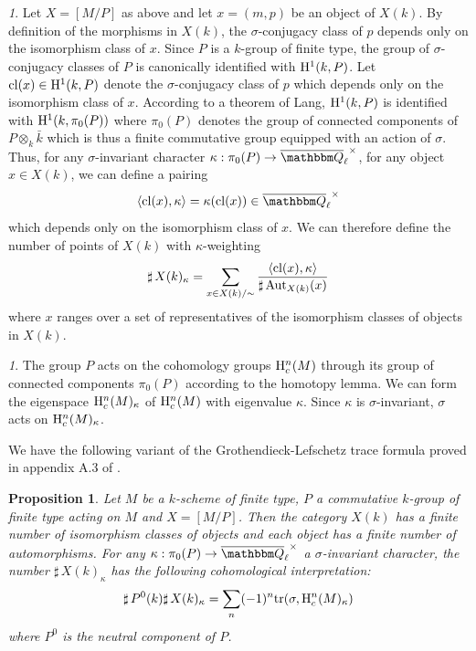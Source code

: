 \documentclass[12pt,english]{smfart}
\numberwithin{equation}{subsection}
\newtheorem{proposition}[equation]{Proposition}
\theoremstyle{remark}
\newtheorem{numero}[equation]{}
\newcommand\QQ{{\mathbbm Q}}
\newcommand\rmH{{\rm H}}
\newcommand\tr{{\rm tr}}
\newcommand\Aut{{\rm Aut}}
\newcommand\cl{{\rm cl}}
\newcommand\Ql{{\overline\QQ_\ell}}
\begin{document}
\begin{numero}
Let $X=[M/ P]$ as above and let $x=(m,p)$ be an object of $X(k)$. By
definition of the morphisms in $X(k)$, the $\sigma$-conjugacy class of
$p$ depends only on the isomorphism class of $x$. Since $P$ is a
$k$-group of finite type, the group of $\sigma$-conjugacy classes of
$P$ is canonically identified with $\rmH^1(k,P)$. Let $\cl(x)\in
\rmH^1(k,P)$ denote the $\sigma$-conjugacy class of $p$ which depends only
on the isomorphism class of $x$. According to a theorem of Lang,
$\rmH^1(k,P)$ is identified with $\rmH^1(k,\pi_0(P))$ where $\pi_0(P)$ denotes
the group of connected components of $P\otimes_k
\bar k$ which is thus a finite commutative group equipped with an action of
$\sigma$. Thus, for any $\sigma$-invariant character $\kappa:
\pi_0(P)\rightarrow \Ql^\times$, for any object $x\in X(k)$, we can
define a pairing
$$\langle \cl(x), \kappa \rangle =\kappa(\cl(x)) \in \Ql^\times$$
which depends only on the isomorphism class of $x$. We can therefore
define the number of points of $X(k)$ with $\kappa$-weighting
$${\sharp\,} X(k)_\kappa= \sum_{x\in X(k)/\sim}
\frac {\langle \cl(x), \kappa \rangle}{{\sharp\,} \Aut_{X(k)}(x)}$$
where $x$ ranges over a set of representatives of the
isomorphism classes of objects in $X(k)$.
\end{numero}

\begin{numero}
The group $P$ acts on the cohomology groups $\rmH^n_c(M)$
through its group of connected components $\pi_0(P)$ according to the
homotopy lemma. We can form the eigenspace
$\rmH^n_c(M)_\kappa$ of $\rmH^n_c(M)$ with eigenvalue $\kappa$.
Since $\kappa$ is $\sigma$-invariant, $\sigma$ acts on
$\rmH^n_c(M)_\kappa$.
\end{numero}

We have the following variant of the Grothendieck-Lefschetz trace formula
proved in appendix A.3 of \cite{LN}.

\begin{proposition}\label{formule des points fixes}
Let $M$ be a $k$-scheme of finite type, $P$ a commutative $k$-group of finite type
acting on $M$ and $X=[M/ P]$. Then the category $X(k)$ has a finite number
of isomorphism classes of objects and each object has a finite number
of automorphisms. For any $\kappa:\pi_0(P)\rightarrow \Ql^\times$ a
$\sigma$-invariant character, the number ${\sharp\,} X(k)_\kappa$ has
the following cohomological interpretation:
$${\sharp\,} P^0(k) {\sharp\,} X(k)_\kappa= \sum_n (-1)^n\tr(\sigma,\rmH^n_c(M)_\kappa)$$
where $P^0$ is the neutral component of $P$.
\end{proposition}
\end{document}
